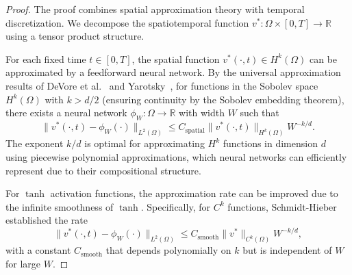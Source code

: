 \documentclass[11pt,reqno]{amsart}
\theoremstyle{plain}
\theoremstyle{definition}
\theoremstyle{remark}
\begin{document}
\begin{proof}
The proof combines spatial approximation theory with temporal discretization. We decompose the spatiotemporal function $v^*: \Omega \times [0,T] \to \mathbb{R}$ using a tensor product structure.

\medskip
{}

\noindent For each fixed time $t \in [0,T]$, the spatial function $v^*(\cdot, t) \in H^k(\Omega)$ can be approximated by a feedforward neural network. By the universal approximation results of DeVore et al.~\cite{devore2021} and Yarotsky~\cite{yarotsky2017}, for functions in the Sobolev space $H^k(\Omega)$ with $k > d/2$ (ensuring continuity by the Sobolev embedding theorem), there exists a neural network $\phi_W: \Omega \to \mathbb{R}$ with width $W$ such that
\begin{equation}\label{eq:spatial_approx}
    \|v^*(\cdot, t) - \phi_W(\cdot)\|_{L^2(\Omega)} \leq C_{\mathrm{spatial}} \|v^*(\cdot,t)\|_{H^k(\Omega)} W^{-k/d}.
\end{equation}
The exponent $k/d$ is optimal for approximating $H^k$ functions in dimension $d$ using piecewise polynomial approximations, which neural networks can efficiently represent due to their compositional structure.

For $\tanh$ activation functions, the approximation rate can be improved due to the infinite smoothness of $\tanh$. Specifically, for $C^k$ functions, Schmidt-Hieber~\cite{schmidt2020nonparametric} established the rate
\begin{equation}
    \|v^*(\cdot, t) - \phi_W(\cdot)\|_{L^2(\Omega)} \leq C_{\mathrm{smooth}} \|v^*\|_{C^k(\Omega)} W^{-k/d},
\end{equation}
with a constant $C_{\mathrm{smooth}}$ that depends polynomially on $k$ but is independent of $W$ for large $W$.

\medskip
{}


\end{proof}
\end{document}
